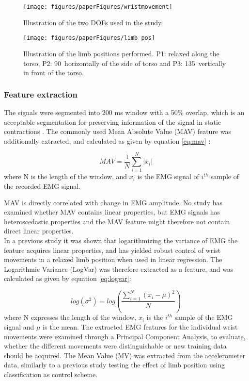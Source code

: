 \begin{multicols}{2}
\begin{figure}[H]
	\centering
	\texttt{[image: figures/paperFigures/wristmovement]}  %
	\caption{Illustration of the two DOFs used in the study.}
	\label{fig:wristmovement}  %
\end{figure}

\begin{figure}[H]
	\centering
	\texttt{[image: figures/paperFigures/limb\_pos]}  %
	\caption{Illustration of the limb positions performed. P1: relaxed along the torso, P2: 90\textdegree\  horizontally of the side of torso and P3: 135\textdegree\ vertically in front of the torso.}
	\label{fig:limbpositions}  %
\end{figure}

\subsubsection*{Feature extraction}
The signals were segmented into 200 ms window with a 50\% overlap, which is an acceptable segmentation for preserving information of the signal in static contractions \cite{Farfan2010}.
The commonly used Mean Absolute Value (MAV) feature was additionally extracted, and calculated as given by equation \ref{eq:mav} \cite{Zecca2002}: 

\begin{equation} \label{eq:mav}
MAV = \frac{1}{N}\sum\limits_{i=1}^N|x_i|
\end{equation}
where N is the length of the window, and $x_i$ is the EMG signal of $i^{th}$ sample of the recorded EMG signal.

MAV is directly correlated with change in EMG amplitude. No study has examined whether MAV contains linear properties, but EMG signals has heteroscedastic properties \cite{rasool2012} and the MAV feature might therefore not contain direct linear properties. \\
In a previous study \cite{hahne2014} it was shown that logarithmizing the variance of EMG the feature acquires linear properties, and has yielded robust control of wrist movements in a relaxed limb position when used in linear regression. The Logarithmic Variance (LogVar) was therefore extracted as a feature, and was calculated as given by equation \ref{eq:logvar}:

\begin{equation} \label{eq:logvar}
log(\sigma^2) = log(\frac{\sum\limits_{i=1}^N(x_i - \mu)^2}{N})
\end{equation}
where N expresses the length of the window, $x_i$ is the $i^{th}$ sample of the EMG signal and $\mu$ is the mean.
The extracted EMG features for the individual wrist movements were examined through a Principal Component Analysis, to evaluate, whether the different movements were distinguishable or new training data should be acquired.
The Mean Value (MV) was extracted from the accelerometer data, similarly to a previous study \cite{Krasoulis2015} testing the effect of limb position using classification as control scheme. 


\end{multicols}
